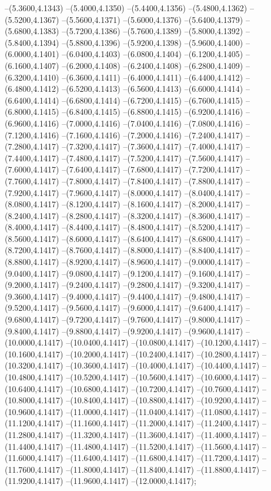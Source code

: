 {	--(5.3600,4.1343)
	--(5.4000,4.1350)
	--(5.4400,4.1356)
	--(5.4800,4.1362)
	--(5.5200,4.1367)
	--(5.5600,4.1371)
	--(5.6000,4.1376)
	--(5.6400,4.1379)
	--(5.6800,4.1383)
	--(5.7200,4.1386)
	--(5.7600,4.1389)
	--(5.8000,4.1392)
	--(5.8400,4.1394)
	--(5.8800,4.1396)
	--(5.9200,4.1398)
	--(5.9600,4.1400)
	--(6.0000,4.1401)
	--(6.0400,4.1403)
	--(6.0800,4.1404)
	--(6.1200,4.1405)
	--(6.1600,4.1407)
	--(6.2000,4.1408)
	--(6.2400,4.1408)
	--(6.2800,4.1409)
	--(6.3200,4.1410)
	--(6.3600,4.1411)
	--(6.4000,4.1411)
	--(6.4400,4.1412)
	--(6.4800,4.1412)
	--(6.5200,4.1413)
	--(6.5600,4.1413)
	--(6.6000,4.1414)
	--(6.6400,4.1414)
	--(6.6800,4.1414)
	--(6.7200,4.1415)
	--(6.7600,4.1415)
	--(6.8000,4.1415)
	--(6.8400,4.1415)
	--(6.8800,4.1415)
	--(6.9200,4.1416)
	--(6.9600,4.1416)
	--(7.0000,4.1416)
	--(7.0400,4.1416)
	--(7.0800,4.1416)
	--(7.1200,4.1416)
	--(7.1600,4.1416)
	--(7.2000,4.1416)
	--(7.2400,4.1417)
	--(7.2800,4.1417)
	--(7.3200,4.1417)
	--(7.3600,4.1417)
	--(7.4000,4.1417)
	--(7.4400,4.1417)
	--(7.4800,4.1417)
	--(7.5200,4.1417)
	--(7.5600,4.1417)
	--(7.6000,4.1417)
	--(7.6400,4.1417)
	--(7.6800,4.1417)
	--(7.7200,4.1417)
	--(7.7600,4.1417)
	--(7.8000,4.1417)
	--(7.8400,4.1417)
	--(7.8800,4.1417)
	--(7.9200,4.1417)
	--(7.9600,4.1417)
	--(8.0000,4.1417)
	--(8.0400,4.1417)
	--(8.0800,4.1417)
	--(8.1200,4.1417)
	--(8.1600,4.1417)
	--(8.2000,4.1417)
	--(8.2400,4.1417)
	--(8.2800,4.1417)
	--(8.3200,4.1417)
	--(8.3600,4.1417)
	--(8.4000,4.1417)
	--(8.4400,4.1417)
	--(8.4800,4.1417)
	--(8.5200,4.1417)
	--(8.5600,4.1417)
	--(8.6000,4.1417)
	--(8.6400,4.1417)
	--(8.6800,4.1417)
	--(8.7200,4.1417)
	--(8.7600,4.1417)
	--(8.8000,4.1417)
	--(8.8400,4.1417)
	--(8.8800,4.1417)
	--(8.9200,4.1417)
	--(8.9600,4.1417)
	--(9.0000,4.1417)
	--(9.0400,4.1417)
	--(9.0800,4.1417)
	--(9.1200,4.1417)
	--(9.1600,4.1417)
	--(9.2000,4.1417)
	--(9.2400,4.1417)
	--(9.2800,4.1417)
	--(9.3200,4.1417)
	--(9.3600,4.1417)
	--(9.4000,4.1417)
	--(9.4400,4.1417)
	--(9.4800,4.1417)
	--(9.5200,4.1417)
	--(9.5600,4.1417)
	--(9.6000,4.1417)
	--(9.6400,4.1417)
	--(9.6800,4.1417)
	--(9.7200,4.1417)
	--(9.7600,4.1417)
	--(9.8000,4.1417)
	--(9.8400,4.1417)
	--(9.8800,4.1417)
	--(9.9200,4.1417)
	--(9.9600,4.1417)
	--(10.0000,4.1417)
	--(10.0400,4.1417)
	--(10.0800,4.1417)
	--(10.1200,4.1417)
	--(10.1600,4.1417)
	--(10.2000,4.1417)
	--(10.2400,4.1417)
	--(10.2800,4.1417)
	--(10.3200,4.1417)
	--(10.3600,4.1417)
	--(10.4000,4.1417)
	--(10.4400,4.1417)
	--(10.4800,4.1417)
	--(10.5200,4.1417)
	--(10.5600,4.1417)
	--(10.6000,4.1417)
	--(10.6400,4.1417)
	--(10.6800,4.1417)
	--(10.7200,4.1417)
	--(10.7600,4.1417)
	--(10.8000,4.1417)
	--(10.8400,4.1417)
	--(10.8800,4.1417)
	--(10.9200,4.1417)
	--(10.9600,4.1417)
	--(11.0000,4.1417)
	--(11.0400,4.1417)
	--(11.0800,4.1417)
	--(11.1200,4.1417)
	--(11.1600,4.1417)
	--(11.2000,4.1417)
	--(11.2400,4.1417)
	--(11.2800,4.1417)
	--(11.3200,4.1417)
	--(11.3600,4.1417)
	--(11.4000,4.1417)
	--(11.4400,4.1417)
	--(11.4800,4.1417)
	--(11.5200,4.1417)
	--(11.5600,4.1417)
	--(11.6000,4.1417)
	--(11.6400,4.1417)
	--(11.6800,4.1417)
	--(11.7200,4.1417)
	--(11.7600,4.1417)
	--(11.8000,4.1417)
	--(11.8400,4.1417)
	--(11.8800,4.1417)
	--(11.9200,4.1417)
	--(11.9600,4.1417)
	--(12.0000,4.1417);
}
